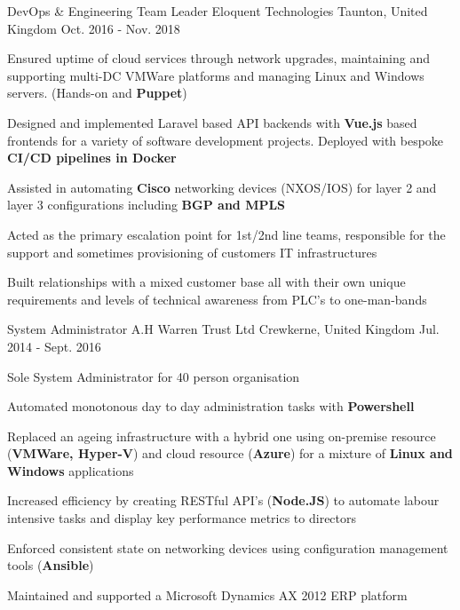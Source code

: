 \begin{cventries}
  \cventry
    {DevOps \& Engineering Team Leader} %
    {Eloquent Technologies} %
    {Taunton, United Kingdom} %
    {Oct. 2016 - Nov. 2018} %
    {
      \begin{cvitems} %
        \item {Ensured uptime of cloud services through network upgrades, maintaining and supporting multi-DC VMWare platforms and managing Linux and Windows servers. (Hands-on and \textbf{Puppet})}
        \item {Designed and implemented Laravel based API backends with \textbf{Vue.js} based frontends for a variety of software development projects. Deployed with bespoke \textbf{CI/CD pipelines in Docker}}
        \item {Assisted in automating \textbf{Cisco} networking devices (NXOS/IOS) for layer 2 and layer 3 configurations including \textbf{BGP and MPLS}}
        \item {Acted as the primary escalation point for 1st/2nd line teams, responsible for the support and sometimes provisioning of customers IT infrastructures}
        \item {Built relationships with a mixed customer base all with their own unique requirements and levels of technical awareness from PLC's to one-man-bands  }
      \end{cvitems}
    }

  \cventry
    {System Administrator} %
    {A.H Warren Trust Ltd} %
    {Crewkerne, United Kingdom} %
    {Jul. 2014 - Sept. 2016} %
    {
      \begin{cvitems} %
        \item {Sole System Administrator for 40 person organisation}
        \item {Automated monotonous day to day administration tasks with \textbf{Powershell}}
        \item {Replaced an ageing infrastructure with a hybrid one using on-premise resource (\textbf{VMWare, Hyper-V}) and cloud resource (\textbf{Azure}) for a mixture of \textbf{Linux and Windows} applications}
        \item {Increased efficiency by creating RESTful API's (\textbf{Node.JS}) to automate labour intensive tasks and display key performance metrics to directors}
        \item {Enforced consistent state on networking devices using configuration management tools (\textbf{Ansible})}
        \item {Maintained and supported a Microsoft Dynamics AX 2012 ERP platform}
      \end{cvitems}
    }


\end{cventries}

